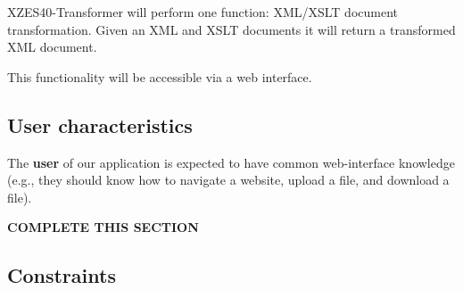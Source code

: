 XZES40-Transformer will perform one function: XML/XSLT document transformation.
Given an XML and XSLT documents it will return a transformed XML document.

This functionality will be accessible via a web interface.


\subsection{User characteristics}

The \textbf{user} of our application is expected to have common web-interface knowledge (e.g., they should know how to navigate a website, upload a file, and download a file).

\textbf{COMPLETE THIS SECTION}


\subsection{Constraints}
% 

